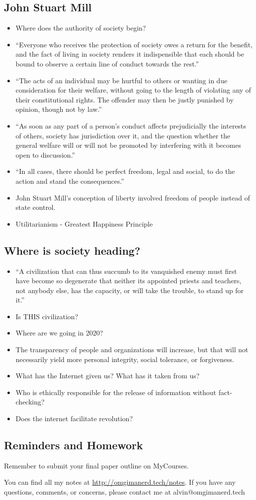 \documentclass[letterpaper, 12pt]{article}
\begin{document}
\subsection*{John Stuart Mill}
\begin{itemize}
  \item Where does the authority of society begin?
  \item ``Everyone who receives the protection of society owes a return for the
    benefit, and the fact of living in society renders it indispensible that
    each should be bound to observe a certain line of conduct towards the
    rest.''
  \item ``The acts of an individual may be hurtful to others or wanting in due
    consideration for their welfare, without going to the length of violating
    any of their constitutional rights. The offender may then be justly
    punished by opinion, though not by law.''
  \item ``As soon as any part of a person's conduct affects prejudicially the
    interests of others, society has jurisdiction over it, and the question
    whether the general welfare will or will not be promoted by interfering
    with it becomes open to discussion.''
  \item ``In all cases, there should be perfect freedom, legal and social, to
    do the action and stand the consequences.''
  \item John Stuart Mill's conception of liberty involved freedom of people
    instead of state control.
  \item Utilitarianism - Greatest Happiness Principle
\end{itemize}

\subsection*{Where is society heading?}
\begin{itemize}
  \item ``A civilization that can thus succumb to its vanquished enemy must
    first have become so degenerate that neither its appointed priests and
    teachers, not anybody else, has the capacity, or will take the trouble, to
    stand up for it.''
  \item Is THIS civilization?
  \item Where are we going in 2020?
  \item The transparency of people and organizations will increase, but that
    will not necessarily yield more personal integrity, social tolerance, or
    forgiveness.
  \item What has the Internet given us? What has it taken from us?
  \item Who is ethically responsible for the release of information without
    fact-checking?
  \item Does the internet facilitate revolution?
\end{itemize}

\subsection*{Reminders and Homework}
Remember to submit your final paper outline on MyCourses.

\begin{center}
  You can find all my notes at \url{http://omgimanerd.tech/notes}. If you have
  any questions, comments, or concerns, please contact me at
  alvin@omgimanerd.tech
\end{center}
\end{document}
